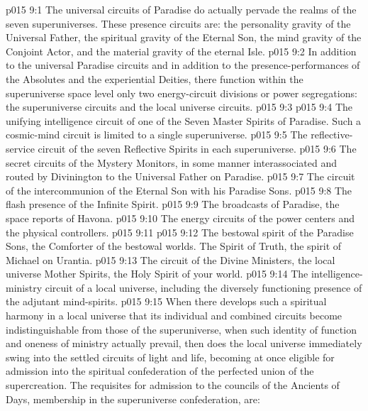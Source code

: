 \vs p015 9:1 The universal circuits of Paradise do actually pervade the realms of the seven superuniverses. These presence circuits are: the personality gravity of the Universal Father, the spiritual gravity of the Eternal Son, the mind gravity of the Conjoint Actor, and the material gravity of the eternal Isle.
\vs p015 9:2 In addition to the universal Paradise circuits and in addition to the presence\hyp{}performances of the Absolutes and the experiential Deities, there function within the superuniverse space level only two energy\hyp{}circuit divisions or power segregations: the superuniverse circuits and the local universe circuits.
\vs p015 9:3 \pc {}
\vs p015 9:4 \bibnobreakspace The unifying intelligence circuit of one of the Seven Master Spirits of Paradise. Such a cosmic\hyp{}mind circuit is limited to a single superuniverse.
\vs p015 9:5 \bibnobreakspace The reflective\hyp{}service circuit of the seven Reflective Spirits in each superuniverse.
\vs p015 9:6 \bibnobreakspace The secret circuits of the Mystery Monitors, in some manner interassociated and routed by Divinington to the Universal Father on Paradise.
\vs p015 9:7 \bibnobreakspace The circuit of the intercommunion of the Eternal Son with his Paradise Sons.
\vs p015 9:8 \bibnobreakspace The flash presence of the Infinite Spirit.
\vs p015 9:9 \bibnobreakspace The broadcasts of Paradise, the space reports of Havona.
\vs p015 9:10 \bibnobreakspace The energy circuits of the power centers and the physical controllers.
\vs p015 9:11 \pc {}
\vs p015 9:12 \pc {}\bibnobreakspace The bestowal spirit of the Paradise Sons, the Comforter of the bestowal worlds. The Spirit of Truth, the spirit of Michael on Urantia.
\vs p015 9:13 \bibnobreakspace The circuit of the Divine Ministers, the local universe Mother Spirits, the Holy Spirit of your world.
\vs p015 9:14 \bibnobreakspace The intelligence\hyp{}ministry circuit of a local universe, including the diversely functioning presence of the adjutant mind\hyp{}spirits.
\vs p015 9:15 \pc When there develops such a spiritual harmony in a local universe that its individual and combined circuits become indistinguishable from those of the superuniverse, when such identity of function and oneness of ministry actually prevail, then does the local universe immediately swing into the settled circuits of light and life, becoming at once eligible for admission into the spiritual confederation of the perfected union of the supercreation. The requisites for admission to the councils of the Ancients of Days, membership in the superuniverse confederation, are:
